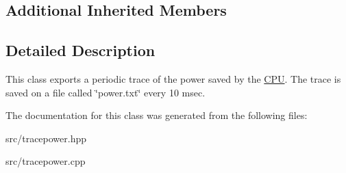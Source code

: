 \subsection*{Additional Inherited Members}


\subsection{Detailed Description}
This class exports a periodic trace of the power saved by the \hyperlink{classRTSim_1_1CPU}{C\+PU}. The trace is saved on a file called \char`\"{}power.\+txt\char`\"{} every 10 msec. 

The documentation for this class was generated from the following files\+:\begin{DoxyCompactItemize}
\item 
src/tracepower.\+hpp\item 
src/tracepower.\+cpp\end{DoxyCompactItemize}
